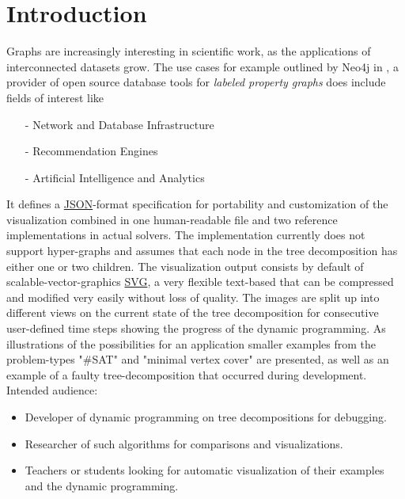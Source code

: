 \documentclass[a4paper, 12pt]{scrartcl}
\begin{document}
\newpage

\tableofcontents

\newpage


\section{Introduction}
Graphs are increasingly interesting in scientific work, as the applications of interconnected datasets grow.
The use cases for example outlined by Neo4j in \cite{graphUseCases}, a provider of open source database tools for \textit{labeled property graphs}  does include fields of interest like
\begin{itemize}
	\item[-] Network and Database Infrastructure
	\item[-] Recommendation Engines
	\item[-] Artificial Intelligence and Analytics
\end{itemize}
It defines a \href{https://www.json.org/json-en.html}{JSON}-format specification for portability and customization of the visualization combined in one human-readable file and two reference implementations in actual solvers.
The implementation currently does not support hyper-graphs and assumes that each node in the tree decomposition has either one or two children.
The visualization output consists by default of scalable-vector-graphics \href{https://developer.mozilla.org/en-US/docs/Web/SVG}{SVG}, a very flexible text-based that can be compressed and modified very easily without loss of quality.
The images are split up into different views on the current state of the tree decomposition for consecutive user-defined time steps showing the progress of the dynamic programming.
As illustrations of the possibilities for an application smaller examples from the problem-types "\#SAT" and "minimal vertex cover" are presented,
as well as an example of a faulty tree-decomposition that occurred during development.
Intended audience: 
\begin{itemize}
	\item Developer of dynamic programming on tree decompositions for debugging.
	\item Researcher of such algorithms for comparisons and visualizations.
	\item Teachers or students looking for automatic visualization of their examples and the dynamic programming.
\end{itemize} 
\end{document}
